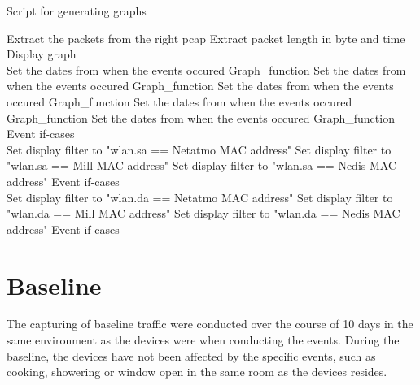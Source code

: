 \begin{algorithm}
\caption{Script for generating graphs}\label{alg:GraphScript}
\begin{algorithmic}
         
            \State Extract the packets from the right pcap
                \State Extract packet length in byte and time
                \State Display graph
            \EndFor
        \EndFor {}\\
          
            \State Set the dates from when the events occured 
            \State Graph\_function
            \State Set the dates from when the events occured 
            \State Graph\_function
            \State Set the dates from when the events occured 
            \State Graph\_function
            \State Set the dates from when the events occured 
            \State Graph\_function
            \State Set the dates from when the events occured 
            \State Graph\_function \\
       \State Event if-cases
        \EndIf\\
            \State Set display filter to "wlan.sa == Netatmo MAC address"
            \State Set display filter to "wlan.sa == Mill MAC address"
            \State Set display filter to "wlan.sa == Nedis MAC address"    
        \State Event if-cases
        \EndIf\\
            \State Set display filter to "wlan.da == Netatmo MAC address"
            \State Set display filter to "wlan.da == Mill MAC address"
            \State Set display filter to "wlan.da == Nedis MAC address"  
        \State Event if-cases
        \EndIf\\
    \EndIf
\end{algorithmic}
\end{algorithm}


\section{Baseline}
The capturing of baseline traffic were conducted over the course of 10 days in the same environment as the devices were when conducting the events. During the baseline, the devices have not been affected by the specific events, such as cooking, showering or window open in the same room as the devices resides. 
